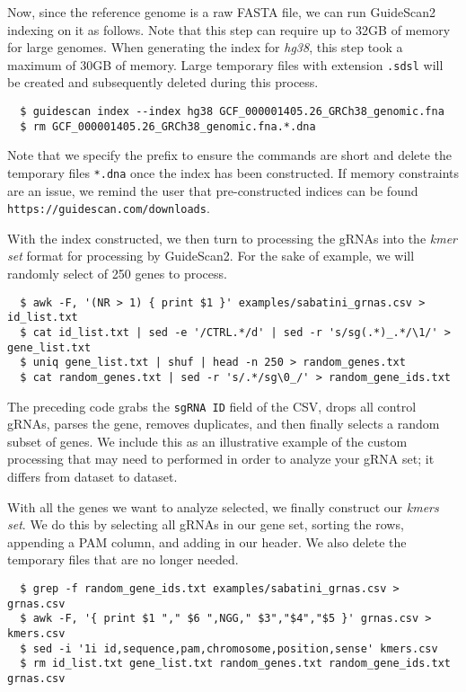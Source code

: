 \documentclass[10pt]{article}
\begin{document}
Now, since the reference genome is a raw FASTA file, we can run
GuideScan2 indexing on it as follows. Note that this step can require
up to 32GB of memory for large genomes. When generating the index for
\textit{hg38}, this step took a maximum of 30GB of memory. Large
temporary files with extension \texttt{.sdsl} will be created and
subsequently deleted during this process.

\begin{verbatim}
  $ guidescan index --index hg38 GCF_000001405.26_GRCh38_genomic.fna
  $ rm GCF_000001405.26_GRCh38_genomic.fna.*.dna
\end{verbatim}

Note that we specify the prefix to ensure the commands are short and
delete the temporary files \texttt{*.dna} once the index has been
constructed. If memory constraints are an issue, we remind the user
that pre-constructed indices can be found \texttt{https://guidescan.com/downloads}.

With the index constructed, we then turn to processing the gRNAs into
the {\it kmer set} format for processing by GuideScan2. For the sake
of example, we will randomly select of 250 genes to process.

\begin{verbatim}
  $ awk -F, '(NR > 1) { print $1 }' examples/sabatini_grnas.csv > id_list.txt
  $ cat id_list.txt | sed -e '/CTRL.*/d' | sed -r 's/sg(.*)_.*/\1/' > gene_list.txt
  $ uniq gene_list.txt | shuf | head -n 250 > random_genes.txt
  $ cat random_genes.txt | sed -r 's/.*/sg\0_/' > random_gene_ids.txt
\end{verbatim}

The preceding code grabs the \texttt{sgRNA ID} field of the CSV, drops
all control gRNAs, parses the gene, removes duplicates, and then
finally selects a random subset of genes. We include this as an
illustrative example of the custom processing that may need to
performed in order to analyze your gRNA set; it differs from dataset
to dataset.

With all the genes we want to analyze selected, we finally construct
our {\it kmers set}. We do this by selecting all gRNAs in our gene
set, sorting the rows, appending a PAM column, and adding in
our header. We also delete the temporary files that are no longer
needed.

\begin{verbatim}
  $ grep -f random_gene_ids.txt examples/sabatini_grnas.csv > grnas.csv
  $ awk -F, '{ print $1 "," $6 ",NGG," $3","$4","$5 }' grnas.csv > kmers.csv
  $ sed -i '1i id,sequence,pam,chromosome,position,sense' kmers.csv
  $ rm id_list.txt gene_list.txt random_genes.txt random_gene_ids.txt grnas.csv
\end{verbatim}
\end{document}
